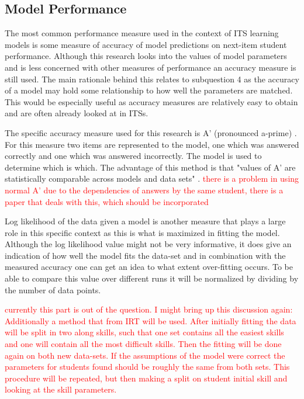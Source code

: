 \documentclass{scrartcl}
\newcommand\todo[1]{\textcolor{red}{#1}}
\begin{document}
\subsection{Model Performance}

\label{sec:perf}
The most common performance measure used in the context of ITS learning models is some measure of accuracy of model predictions on next-item student performance. Although this research looks into the values of model parameters and is less concerned with other measures of performance an accuracy measure is still used. The main rationale behind this relates to subquestion 4 as the accuracy of a model may hold some relationship to how well the parameters are matched. This would be especially useful as accuracy measures are relatively easy to obtain and are often already looked at in ITSs. 

The specific accuracy measure used for this research is A' (pronounced a-prime) \cite{modelreview}. For this measure two items are represented to the model, one which was answered correctly and one which was answered incorrectly. The model is used to determine which is which. The advantage of this method is that "values of A' are statistically comparable across models and data sets" \cite{modelreview}. \todo{there is a problem in using normal A' due to the dependencies of answers by the same student, there is a paper that deals with this, which should be incorporated}

Log likelihood of the data given a model is another measure that plays a large role in this specific context as this is what is maximized in fitting the model. Although the log likelihood value might not be very informative, it does give an indication of how well the model fits the data-set and in combination with the measured accuracy one can get an idea to what extent over-fitting occurs. To be able to compare this value over different runs it will be normalized by dividing by the number of data points.


\todo{currently this part is out of the question. I might bring up this discussion again:
Additionally a method that from IRT \cite{hambleton} will be used. After initially fitting the data will be split in two along skills, such that one set contains all the easiest skills and one will contain all the most difficult skills. Then the fitting will be done again on both new data-sets. If the assumptions of the model were correct the parameters for students found should be roughly the same from both sets. This procedure will be repeated, but then making a split on student initial skill and looking at the skill parameters.}
\end{document}
